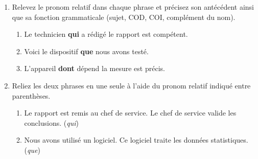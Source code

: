 \documentclass[11pt]{article}
\begin{document}
\begin{exercice}
\begin{enumerate}
    \item Relevez le pronom relatif dans chaque phrase et précisez son antécédent ainsi que sa fonction grammaticale (sujet, COD, COI, complément du nom).
    \begin{enumerate}
        \item Le technicien \textbf{qui} a rédigé le rapport est compétent.
        \item Voici le dispositif \textbf{que} nous avons testé.
        \item L'appareil \textbf{dont} dépend la mesure est précis.
    \end{enumerate}
    \item Reliez les deux phrases en une seule à l'aide du pronom relatif indiqué entre parenthèses.
    \begin{enumerate}
        \item Le rapport est remis au chef de service. Le chef de service valide les conclusions. (\textit{qui})
        \item Nous avons utilisé un logiciel. Ce logiciel traite les données statistiques. (\textit{que})
    \end{enumerate}
\end{enumerate}
\end{exercice}
\end{document}
